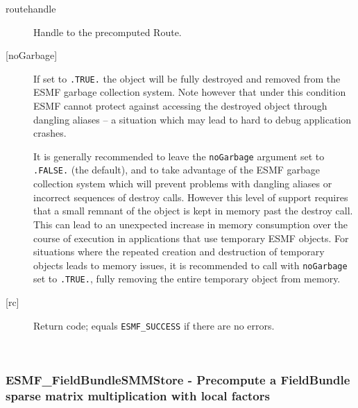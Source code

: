    \begin{description}
   \item [routehandle]
   Handle to the precomputed Route.
   \item[{[noGarbage]}]
   If set to {\tt .TRUE.} the object will be fully destroyed and removed
   from the ESMF garbage collection system. Note however that under this
   condition ESMF cannot protect against accessing the destroyed object
   through dangling aliases -- a situation which may lead to hard to debug
   application crashes.
  
   It is generally recommended to leave the {\tt noGarbage} argument
   set to {\tt .FALSE.} (the default), and to take advantage of the ESMF
   garbage collection system which will prevent problems with dangling
   aliases or incorrect sequences of destroy calls. However this level of
   support requires that a small remnant of the object is kept in memory
   past the destroy call. This can lead to an unexpected increase in memory
   consumption over the course of execution in applications that use
   temporary ESMF objects. For situations where the repeated creation and
   destruction of temporary objects leads to memory issues, it is
   recommended to call with {\tt noGarbage} set to {\tt .TRUE.}, fully
   removing the entire temporary object from memory.
   \item [{[rc]}]
   Return code; equals {\tt ESMF\_SUCCESS} if there are no errors.
   \end{description}
   
 
\mbox{}\hrulefill\ 
 
\subsubsection [ESMF\_FieldBundleSMMStore] {ESMF\_FieldBundleSMMStore - Precompute a FieldBundle sparse matrix multiplication with local factors}


